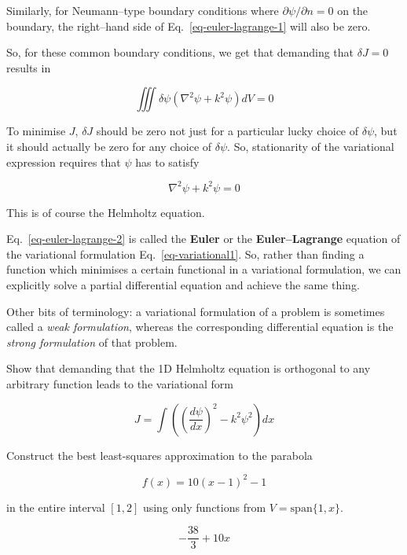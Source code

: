 Similarly, for Neumann--type boundary conditions where $\partial \psi / \partial n = 0$ on the boundary, the right--hand side of Eq.~\ref{eq-euler-lagrange-1} will also be zero.

So, for these common boundary conditions, we get that demanding that $\delta J = 0$ results in

\begin{equation}
\iiint \delta \psi (\nabla^2 \psi + k^2 \psi ) dV = 0
\end{equation} 

To minimise $J$, $\delta J$ should be zero not just for a particular lucky choice of $\delta \psi$, but it should actually be zero for any choice of $\delta \psi$. So, stationarity of the variational expression requires that $\psi$ has to satisfy

\begin{equation}
\nabla^2 \psi + k^2 \psi = 0 \label{eq-euler-lagrange-2}
\end{equation} 

This is of course the Helmholtz equation.

Eq.~\ref{eq-euler-lagrange-2} is called the \textbf{Euler} or the \textbf{Euler--Lagrange} equation of the variational formulation Eq.~\ref{eq-variational1}. So, rather than finding a function which minimises a certain functional in a variational formulation, we can explicitly solve a partial differential equation and achieve the same thing.

Other bits of terminology: a variational formulation of a problem is sometimes called a \emph{weak formulation}, whereas the corresponding differential equation is the \emph{strong formulation} of that problem.

\pagebreak

\begin{exer}
Show that demanding that the 1D Helmholtz equation is orthogonal to any arbitrary function leads to the variational form 

$$J = \int \left( \left(\frac{d \psi}{d x}\right)^2 - k^2 \psi^2 \right) dx$$

\end{exer}


\begin{exer}
  
Construct the best least-squares approximation to the parabola 

$$f(x) = 10(x-1)^2 -1$$ 

in the entire interval $[1,2]$ using only functions from $V = \mathrm{span} \{1, x\}$.

\begin{sol}
$$-\frac{38}{3} + 10x$$   
\end{sol}
\end{exer}


